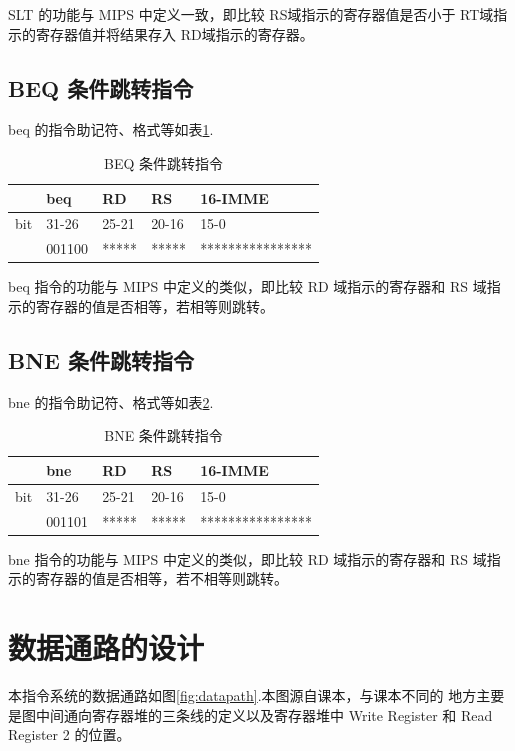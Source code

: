 \documentclass[a4paper,dvipdfm]{ctexart}
\begin{document}
SLT 的功能与 MIPS 中定义一致，即比较 RS域指示的寄存器值是否小于 RT域指
示的寄存器值并将结果存入 RD域指示的寄存器。

\subsection{BEQ 条件跳转指令}
\label{sec:beq-}

beq 的指令助记符、格式等如表\ref{tab:beq}.

\begin{table}[hbt!]
  \centering
  \begin{tabular}{|l|l|l|l|l|}
    \hline
    &beq&RD&RS&16-IMME\\
    \hline
    bit&31-26&25-21&20-16&15-0\\
    \hline
    &001100&*****&*****&****************\\
    \hline
  \end{tabular}
  \caption{BEQ 条件跳转指令}
  \label{tab:beq}
\end{table}

beq 指令的功能与 MIPS 中定义的类似，即比较 RD 域指示的寄存器和 RS 域指
示的寄存器的值是否相等，若相等则跳转。

\subsection{BNE 条件跳转指令}
\label{sec:bne-}

bne 的指令助记符、格式等如表\ref{tab:bne}.

\begin{table}[hbt!]
  \centering
  \begin{tabular}{|l|l|l|l|l|}
    \hline
    &bne&RD&RS&16-IMME\\
    \hline
    bit&31-26&25-21&20-16&15-0\\
    \hline
    &001101&*****&*****&****************\\
    \hline
  \end{tabular}
  \caption{BNE 条件跳转指令}
  \label{tab:bne}
\end{table}

bne 指令的功能与 MIPS 中定义的类似，即比较 RD 域指示的寄存器和 RS 域指
示的寄存器的值是否相等，若不相等则跳转。

\section{数据通路的设计}
\label{sec:datapath}

本指令系统的数据通路如图\ref{fig:datapath}.本图源自课本，与课本不同的
地方主要是图中间通向寄存器堆的三条线的定义以及寄存器堆中 Write
Register 和 Read Register 2 的位置。
\end{document}

